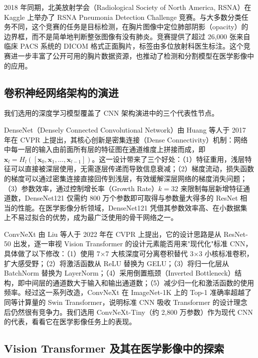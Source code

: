 \documentclass[12pt,a4paper,UTF8,openany]{ctexbook}
\begin{document}
2018 年同期，北美放射学会（Radiological Society of North America, RSNA）在 Kaggle 上举办了 RSNA Pneumonia Detection Challenge 竞赛\cite{rsna2018}。与大多数分类任务不同，这个竞赛的任务是目标检测，在胸片图像中定位肺部阴影（opacity）的边界框，而不是简单地判断整张图像有没有肺炎。竞赛提供了超过 26,000 张来自临床 PACS 系统的 DICOM 格式正面胸片，标签由多位放射科医生标注。这个竞赛进一步丰富了公开可用的胸片数据资源，也推动了检测和分割模型在医学影像中的应用。

\subsection{卷积神经网络架构的演进}

我们选用的深度学习模型覆盖了 CNN 架构演进中的三个代表性节点。

DenseNet（Densely Connected Convolutional Network）由 Huang 等人于 2017 年在 CVPR 上提出\cite{huang2017}，其核心创新是密集连接（Dense Connectivity）机制：网络中每一层的输入由前面所有层的特征图在通道维度上拼接而成，即 $\mathbf{x}_l = H_l([\mathbf{x}_0, \mathbf{x}_1, \ldots, \mathbf{x}_{l-1}])$。这一设计带来了三个好处：（1）特征重用，浅层特征可以直接被深层使用，无需逐层传递而导致信息衰减；（2）梯度流动，损失函数的梯度可以通过密集连接直接回传到浅层，有效缓解深层网络的梯度消失问题；（3）参数效率，通过控制增长率（Growth Rate）$k=32$ 来限制每层新增特征通道数，DenseNet121 仅需约 800 万个参数即可取得与参数量大得多的 ResNet 相当的性能。在医学影像分析领域，DenseNet121 凭借其参数效率高、在小数据集上不易过拟合的优势，成为最广泛使用的骨干网络之一。

ConvNeXt 由 Liu 等人于 2022 年在 CVPR 上提出\cite{liu2022}，它的设计思路是从 ResNet-50 出发，逐一审视 Vision Transformer 的设计元素能否用来"现代化"标准 CNN，具体做了以下修改：（1）使用 7×7 大核深度可分离卷积替代 3×3 小核标准卷积，扩大感受野；（2）将激活函数从 ReLU 替换为 GELU；（3）将归一化层从 BatchNorm 替换为 LayerNorm；（4）采用倒置瓶颈（Inverted Bottleneck）结构，即中间层的通道数大于输入和输出通道数；（5）减少归一化和激活函数的使用频率。经过这一系列改造，ConvNeXt 在 ImageNet-1K 上的 Top-1 准确率超越了同等计算量的 Swin Transformer，说明标准 CNN 吸收 Transformer 的设计理念后仍然很有竞争力。我们选用 ConvNeXt-Tiny（约 2,800 万参数）作为现代 CNN 的代表，看看它在医学影像任务上的表现。

\subsection{Vision Transformer 及其在医学影像中的探索}
\end{document}
